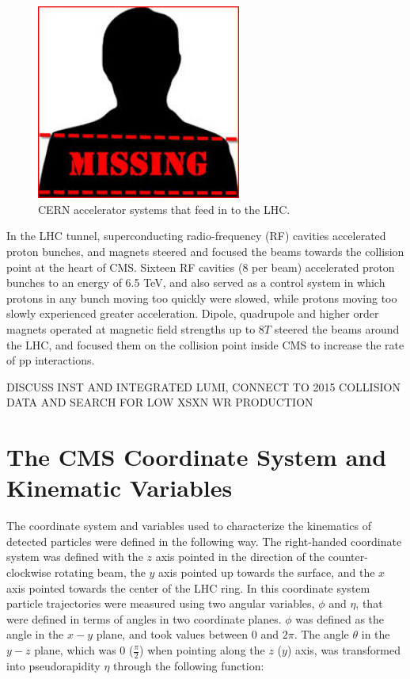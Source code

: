 \begin{figure}[ht]
	\centering
	\includegraphics[width=0.6\textwidth]{figures/missingImage.png}
	\caption{CERN accelerator systems that feed in to the LHC.}
	\label{fig:accelComplex}
\end{figure}


In the LHC tunnel, superconducting radio-frequency (RF) cavities accelerated proton bunches, and magnets steered and 
focused the beams towards the collision point at the heart of CMS.  Sixteen RF cavities (8 per beam) accelerated proton 
bunches to an energy of 6.5 TeV, and also served as a control system in which protons in any bunch moving too quickly 
were slowed, while protons moving too slowly experienced greater acceleration.  Dipole, quadrupole and higher order 
magnets operated at magnetic field strengths up to 8$\unit{T}$ steered the beams around the LHC, and focused them 
on the collision point inside CMS to increase the rate of pp interactions.

DISCUSS INST AND INTEGRATED LUMI, CONNECT TO 2015 COLLISION DATA AND SEARCH FOR LOW XSXN WR PRODUCTION

\section{The CMS Coordinate System and Kinematic Variables}
\label{sec:coordinateSystemAndKinematicVars}
The coordinate system and variables used to characterize the kinematics of detected particles were defined in 
the following way.  The right-handed coordinate system was defined with the $z$ axis pointed in the direction 
of the counter-clockwise rotating beam, the $y$ axis pointed up towards the surface, and the $x$ axis pointed towards 
the center of the LHC ring.  In this coordinate system particle trajectories were measured using two angular 
variables, $\phi$ and $\eta$, that were defined in terms of angles in two coordinate planes.  $\phi$ was defined 
as the angle in the $x-y$ plane, and took values between 0 and $2\pi$.  The angle $\theta$ in the $y-z$ plane, 
which was 0 ($\frac{\pi}{2}$) when pointing along the $z$ ($y$) axis, was transformed into pseudorapidity 
$\eta$ through the following function:

